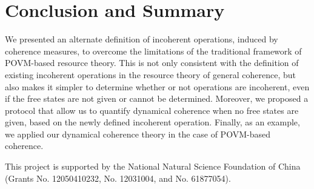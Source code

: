 \documentclass[american,aps,pra,reprint, superscriptaddress]{revtex4-1}
\theoremstyle{plain}
\theoremstyle{definition}
\theoremstyle{remark}
\begin{document}
\section{Conclusion and Summary}

We presented an alternate definition of incoherent operations, induced by coherence measures, to overcome the limitations of the traditional framework of POVM-based resource theory. This is not only consistent with the definition of existing incoherent operations in the resource theory of general coherence, but also makes it simpler to determine whether or not operations are incoherent, even if the free states are not given or cannot be determined.
Moreover, we proposed a protocol that allow us to quantify dynamical coherence when no free states are given, based on the newly defined incoherent operation. Finally, as an example, we applied our dynamical coherence theory in the case of POVM-based coherence.


\begin{acknowledgments}
This project is supported by the National Natural Science Foundation of China (Grants No. 12050410232, No. 12031004, and No. 61877054).
\end{acknowledgments}


%
% 
\end{document}
